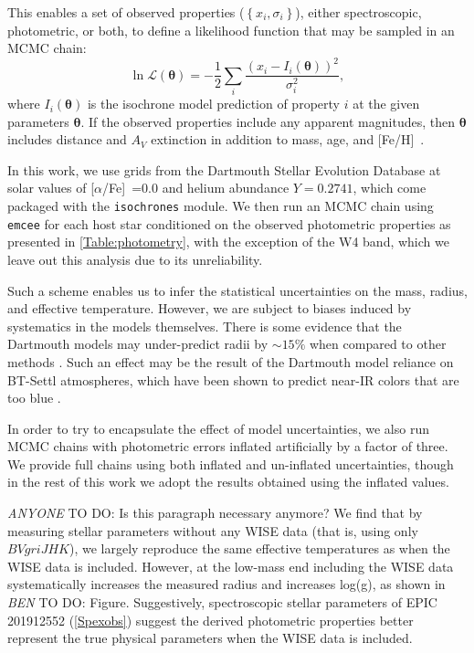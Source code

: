 \documentclass{emulateapj}
\newcommand{\logg}{{log(g)}}
\newcommand{\feh}{{[Fe/H]}~}
\newcommand{\afe}{{[$\alpha$/Fe]}~}
\newcommand{\todo}[3]{{\color{#2} \emph{#1} TO DO: #3}}
\newcommand{\btmtodo}[1]{\todo{BEN}{red}{#1}}
\newcommand{\anytodo}[1]{\todo{ANYONE}{NavyBlue}{#1}}
\begin{document}
This enables a set of observed properties ($\left\{ x_i, \sigma_i \right\}$), 
either spectroscopic, photometric, 
or both, to define a likelihood function that may be sampled in
an MCMC chain:
\begin{equation}
\label{eq:ischochronelhood}
\ln \mathcal L(\boldsymbol{\theta}) = -\frac{1}{2} \displaystyle \sum_i \frac{\left(x_i - 
  I_i\left(\boldsymbol{\theta} \right)\right)^2}{\sigma_i^2},
\end{equation}
where $I_i(\boldsymbol{\theta})$ is the isochrone model prediction of property 
$i$ at the given parameters $\boldsymbol{\theta}$.  
If the observed properties include any apparent magnitudes, then 
$\boldsymbol{\theta}$ includes distance and $A_V$ extinction in addition 
to mass, age, and \feh.

In this work, we use grids from the Dartmouth Stellar
Evolution Database \citep{Dotter08} at solar values of \afe=$0.0$ and
helium abundance $Y=0.2741$, which come packaged with the \texttt{isochrones}
module.  
We then run an MCMC chain using \texttt{emcee} \citep{Foreman-Mackey12}
for each host star conditioned on the observed 
photometric properties as presented in \ref{Table:photometry}, with 
the exception of the W4 band, which we leave out this analysis due to 
its unreliability.  

Such a scheme enables us to infer the statistical uncertainties on the
mass, radius, and effective temperature.
However, we are subject to biases induced by systematics in the models themselves.
There is some evidence that the Dartmouth models may under-predict
radii by $\sim 15\%$ when compared to other methods \citep{Newton15,
Montet15}.
Such an effect may be the result of the Dartmouth model reliance on BT-Settl
atmospheres, which have been shown to predict near-IR colors that are too blue
\citep{Thompson14}.

In order to try to encapsulate the effect of model uncertainties, we also run 
MCMC chains with photometric errors inflated artificially by a factor of three.  
We provide full chains using both inflated and un-inflated uncertainties, 
though in the rest of this work we adopt
the results obtained using the inflated values.

\anytodo{Is this paragraph necessary anymore?}
We find that by measuring stellar parameters without any WISE data (that is, using
only $BVgriJHK$), we largely reproduce the same effective temperatures as when
the WISE data is included.
However, at the low-mass end including the WISE data systematically increases the
measured radius and increases \logg, as shown in \btmtodo{Figure}.
Suggestively, spectroscopic stellar parameters of EPIC 201912552
(\textsection\ref{Spexobs}) suggest the derived photometric properties better
represent the true physical parameters when the WISE data is included.
\end{document}
